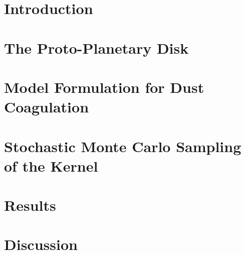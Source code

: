 \cleardoublepage\chapter{Introduction}
    \label{ch:introduction}
    

\cleardoublepage\chapter{The Proto-Planetary Disk}
    \label{ch:disk}
    
    

\cleardoublepage\chapter{Model Formulation for Dust Coagulation}
    \label{ch:smoluchoswki}
    

\cleardoublepage\chapter{Stochastic Monte Carlo Sampling of the Kernel}
    \label{ch:sampling}
    

\cleardoublepage\chapter*{Results}
    \label{ch:results}
    

\cleardoublepage\chapter{Discussion}
    \label{ch:discussion}
    
